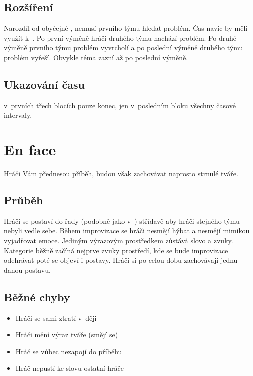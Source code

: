 \subsection{ Rozšíření } Narozdíl od obyčejné , nemusí  prvního týmu hledat problém. Čas navíc by měli využít k~. Po první výměně hráči druhého týmu nachází problém. Po druhé výměně  prvního týmu problém vyvrcholí a po poslední výměně  druhého týmu problém vyřeší. Obvykle téma zazní až po poslední výměně. 
 
\subsection{ Ukazování času }   v~prvních třech blocích pouze konec, jen v~posledním bloku všechny časové intervaly. 
 
 
 
 
 
\needspace{5cm} \section{En face} \label{en face}  
 
Hráči Vám přednesou příběh, budou však zachovávat naprosto strnulé tváře. 
 
\subsection{ Průběh } Hráči se postaví do řady (podobně jako v~) střídavě aby hráči stejného týmu nebyli vedle sebe. Během improvizace se hráči nesmějí hýbat a nesmějí mimikou vyjadřovat emoce. Jediným výrazovým prostředkem zůstává slovo a zvuky. Kategorie běžně začíná nejprve zvuky prostředí, kde se bude improvizace odehrávat poté se objeví i postavy. Hráči si po celou dobu zachovávají jednu danou postavu. 
 
\subsection{ Běžné chyby } \begin{itemize}
\item  Hráči se sami ztratí v~ději
\item  Hráči mění výraz tváře (smějí se)
\item  Hráč se vůbec nezapojí do příběhu
\item  Hráč nepustí ke slovu ostatní hráče
\end{itemize}
 
